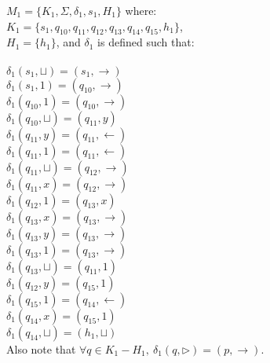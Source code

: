 \documentclass[12pt]{article}
\begin{document}
$M_1  = \{K_1, \Sigma, \delta_1, s_1, H_1\}$ where:\\
$K_1  = \{s_1, q_{10}, q_{11}, q_{12}, q_{13}, q_{14}, q_{15}, h_1\}$,\\
$H_1  = \{h_1 \}$, and $\delta_1$ is defined such that:\\ \\
$\delta_1(s_1, \sqcup) = (s_1, \rightarrow)$\\
$\delta_1(s_1, 1) = (q_{10}, \rightarrow)$\\
$\delta_1(q_{10}, 1) = (q_{10}, \rightarrow)$\\
$\delta_1(q_{10}, \sqcup) = (q_{11}, y)$\\
$\delta_1(q_{11}, y) = (q_{11}, \leftarrow)$\\
$\delta_1(q_{11}, 1) = (q_{11}, \leftarrow)$\\
$\delta_1(q_{11}, \sqcup) = (q_{12}, \rightarrow)$\\
$\delta_1(q_{11}, x) = (q_{12}, \rightarrow)$\\
$\delta_1(q_{12}, 1) = (q_{13}, x)$\\
$\delta_1(q_{13}, x) = (q_{13}, \rightarrow)$\\
$\delta_1(q_{13}, y) = (q_{13}, \rightarrow)$\\
$\delta_1(q_{13}, 1) = (q_{13}, \rightarrow)$\\
$\delta_1(q_{13}, \sqcup) = (q_{11}, 1)$\\
$\delta_1(q_{12}, y) = (q_{15}, 1)$\\
$\delta_1(q_{15}, 1) = (q_{14}, \leftarrow)$\\
$\delta_1(q_{14}, x) = (q_{15}, 1)$\\
$\delta_1(q_{14}, \sqcup) = (h_1, \sqcup)$\\

Also note that $\forall q \in K_1 - H_1,\ \delta_1(q, \triangleright) = (p, \rightarrow).$
 \\
\end{document}
